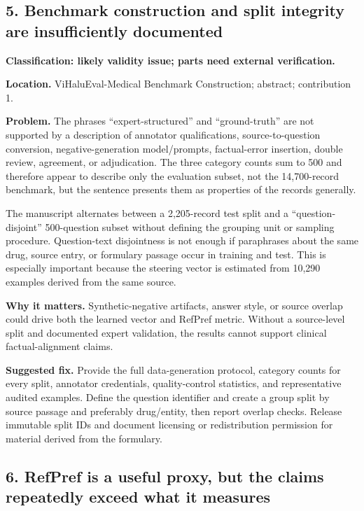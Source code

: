 \documentclass[11pt]{article}
\begin{document}
\subsection*{5. Benchmark construction and split integrity are insufficiently documented}

\textbf{Classification: likely validity issue; parts need external verification.}

\textbf{Location.} ViHaluEval-Medical Benchmark Construction; abstract; contribution 1.

\textbf{Problem.} The phrases ``expert-structured'' and ``ground-truth'' are not supported by a description of annotator qualifications, source-to-question conversion, negative-generation model/prompts, factual-error insertion, double review, agreement, or adjudication.  The three category counts sum to 500 and therefore appear to describe only the evaluation subset, not the 14,700-record benchmark, but the sentence presents them as properties of the records generally.

The manuscript alternates between a 2,205-record test split and a ``question-disjoint'' 500-question subset without defining the grouping unit or sampling procedure.  Question-text disjointness is not enough if paraphrases about the same drug, source entry, or formulary passage occur in training and test.  This is especially important because the steering vector is estimated from 10,290 examples derived from the same source.

\textbf{Why it matters.} Synthetic-negative artifacts, answer style, or source overlap could drive both the learned vector and RefPref metric.  Without a source-level split and documented expert validation, the results cannot support clinical factual-alignment claims.

\textbf{Suggested fix.} Provide the full data-generation protocol, category counts for every split, annotator credentials, quality-control statistics, and representative audited examples.  Define the question identifier and create a group split by source passage and preferably drug/entity, then report overlap checks.  Release immutable split IDs and document licensing or redistribution permission for material derived from the formulary.

\subsection*{6. RefPref is a useful proxy, but the claims repeatedly exceed what it measures}
\end{document}
